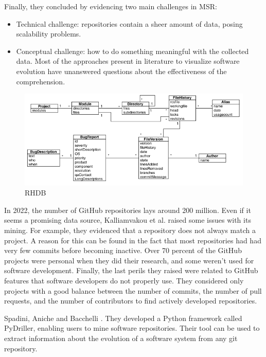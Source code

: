 Finally, they concluded by evidencing two main challenges in MSR:
\begin{itemize}
  \item Technical challenge: repositories contain a sheer amount of data, posing scalability problems. 
  \item Conceptual challenge: how to do something meaningful with the collected data. 
  Most of the approaches present in literature to visualize software evolution have unanswered questions about the effectiveness of the comprehension. 
\end{itemize}

\begin{figure}[H]
  \includegraphics[width=0.9\linewidth]{RHDB.png} 
  \caption{RHDB}
  \label{fig:RHDB}
\end{figure}
 


\bigbreak
In 2022, the number of GitHub repositories lays around 200 million.
Even if it seems a promising data source, Kalliamvakou et al. raised some issues with its mining. \cite{Kalliamvakou2014} 
For example, they evidenced that a repository does not always match a project. 
A reason for this can be found in the fact that most repositories had had very few commits before becoming inactive.
Over 70 percent of the GitHub projects were personal when they did their research, and some weren't used for software development. 
Finally, the last perils they raised were related to GitHub features that software developers do not properly use.
They considered only projects with a good balance between the number of commits, 
the number of pull requests, and the number of contributors to find actively developed repositories. 
 

\bigbreak
Spadini, Aniche and Bacchelli \cite{Spadini2018}. They developed a Python framework called PyDriller, enabling users to mine software repositories. 
Their tool can be used to extract information about the evolution of a software system from any git repository.  

